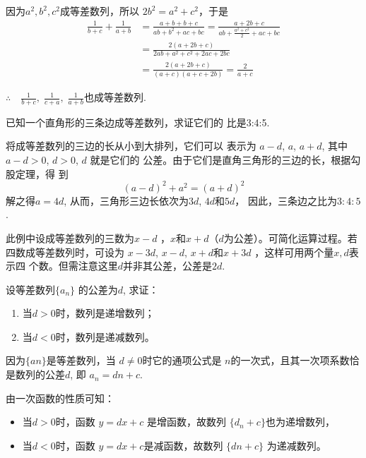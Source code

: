 \begin{solution}
因为$a^2,b^2,c^2$成等差数列，所以
$2b^2=a^2+c^2$，于是
\[\begin{split}
\frac{1}{b+c}+\frac{1}{a+b}&=\frac{a+b+b+c}{ab+b^2+ac+bc}=\frac{a+2b+c}{ab+\frac{a^2+c^2}{2}+ac+bc}\\
&=\frac{2(a+2b+c)}{2ab+a^2+c^2+2ac+2bc}\\
&=\frac{2(a+2b+c)}{(a+c)(a+c+2b)}=\frac{2}{a+c}
\end{split}\]

$\therefore\quad \frac{1}{b+c},\;\frac{1}{c+a},\; \frac{1}{a+b}$也成等差数列.
\end{solution}



\begin{example}
    已知一个直角形的三条边成等差数列，求证它们的
比是3:4:5.
\end{example}


\begin{solution}
    将成等差数列的三边的长从小到大排列，它们可以
表示为
$a-d$, $a$, $a+d$,
其中
$a-d>0$, $d>0$, $d$
就是它们的
公差。由于它们是直角三角形的三边的长，根据勾股定理，得
到
\[(a-d)^2+a^2=(a+d)^2\]
解之得$a=4d$, 
从而，三角形三边长依次为$3d$, $4d$和$5d$，
因此，三条边之比为$3:4:5$.
\end{solution}

\begin{rmk}
此例中设成等差数列的三数为$x-d$
，$x$和$x+d$（$d$为公差）。可简化运算过程。若四数成等差数列时，可设为
$x-3d$, $x-d$, $x+d$和$x+3d$
，这样可用两个量$x,d$表示四
个数。但需注意这里$d$并非其公差，公差是$2d$.
\end{rmk}

\begin{example}
    设等差数列$\{a_n\}$
的公差为$d$, 求证：
\begin{enumerate}[(1)]
\item 当$d>0$时，数列是递增数列；
\item 当$d<0$时，数列是递减数列。
\end{enumerate}
\end{example}

\begin{solution}
因为$\{an\}$是等差数列，当
$d\ne 0$时它的通项公式是
$n$的一次式，且其一次项系数恰是数列的公差$d$, 即
$a_n=dn+c$.

由一次函数的性质可知：
\begin{itemize}
    \item 当$d>0$时，函数
$y=dx+c$
是增函数，故数列
$\{d_n+c\}$也为递增数列，
\item 当$d<0$时，函数
$y=dx+c$是减函数，故数列
$\{dn+c\}$
为递减数列。
\end{itemize}
\end{solution}


